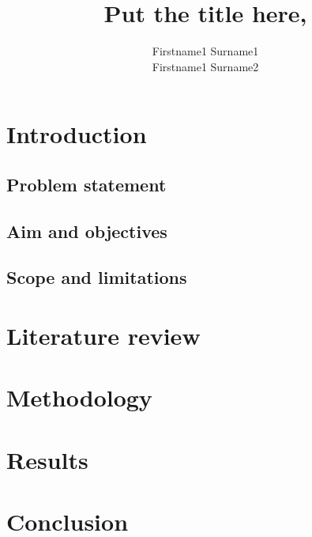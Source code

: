 \documentclass{template}
\title{Put the title here,}
\author{Firstname1 Surname1\\Firstname1 Surname2}
\begin{document}
\chapter{Introduction}\label{ch:in}
\section{Problem statement}
\section{Aim and objectives}
\section{Scope and limitations}
\chapter{Literature review}
\chapter{Methodology}
\chapter{Results}
\chapter{Conclusion}

\cite{gulawani2006cfd}

\appendix
\end{document}
